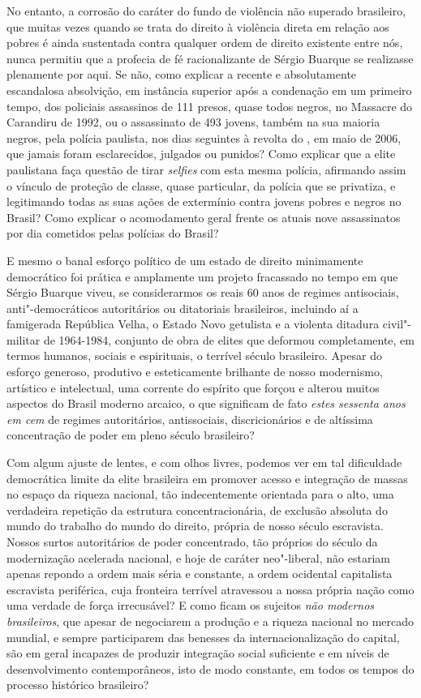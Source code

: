 No entanto, a corrosão do caráter do fundo de violência não superado
brasileiro, que muitas vezes quando se trata do direito à violência
direta em relação aos pobres é ainda sustentada contra qualquer ordem de
direito existente entre nós, nunca permitiu que a profecia de fé
racionalizante de Sérgio Buarque se realizasse plenamente por aqui. Se
não, como explicar a recente e absolutamente escandalosa absolvição, em
instância superior após a condenação em um primeiro tempo, dos policiais
assassinos de 111 presos, quase todos negros, no Massacre do Carandiru
de 1992, ou o assassinato de 493 jovens, também na sua maioria negros,
pela polícia paulista, nos dias seguintes à revolta do , em maio de
2006, que jamais foram esclarecidos, julgados ou punidos? Como explicar
que a elite paulistana faça questão de tirar \emph{selfies} com esta
mesma polícia, afirmando assim o vínculo de proteção de classe, quase
particular, da polícia que se privatiza, e legitimando todas as suas
ações de extermínio contra jovens pobres e negros no Brasil? Como
explicar o acomodamento geral frente os atuais nove assassinatos por dia
cometidos pelas polícias do Brasil?

E mesmo o banal esforço político de um estado de direito minimamente
democrático foi prática e amplamente um projeto fracassado no tempo em
que Sérgio Buarque viveu, se considerarmos os reais 60 anos de regimes
antisociais, anti"-democráticos autoritários ou ditatoriais brasileiros,
incluindo aí a famigerada República Velha, o Estado Novo getulista e a
violenta ditadura civil"-militar de 1964-1984, conjunto de obra de elites
que deformou completamente, em termos humanos, sociais e espirituais, o
terrível século  brasileiro. Apesar do esforço generoso, produtivo e
esteticamente brilhante de nosso modernismo, artístico e intelectual,
uma corrente do espírito que forçou e alterou muitos aspectos do Brasil
moderno arcaico, o que significam de fato \emph{estes sessenta anos em
cem} de regimes autoritários, antissociais, discricionários e de
altíssima concentração de poder em pleno século  brasileiro?

Com algum ajuste de lentes, e com olhos livres, podemos ver em tal
dificuldade democrática limite da elite brasileira em promover acesso e
integração de massas no espaço da riqueza nacional, tão indecentemente
orientada para o alto, uma verdadeira repetição da estrutura
concentracionária, de exclusão absoluta do mundo do trabalho do mundo do
direito, própria de nosso século  escravista. Nossos surtos
autoritários de poder concentrado, tão próprios do século da
modernização acelerada nacional, e hoje de caráter neo"-liberal, não
estariam apenas repondo a ordem mais séria e constante, a ordem
ocidental capitalista escravista periférica, cuja fronteira terrível
atravessou a nossa própria nação como uma verdade de força irrecusável?
E como ficam os sujeitos \emph{não modernos brasileiros}, que apesar de
negociarem a produção e a riqueza nacional no mercado mundial, e sempre
participarem das benesses da internacionalização do capital, são em
geral incapazes de produzir integração social suficiente e em níveis de
desenvolvimento contemporâneos, isto de modo constante, em todos os
tempos do processo histórico brasileiro?

